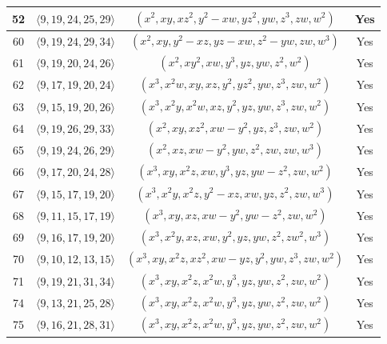 \documentclass{amsart}
\theoremstyle{plain}
\theoremstyle{definition}
\numberwithin{theorem}{section}
\numberwithin{equation}{section}
\numberwithin{equation}{theorem}
\begin{document}
\begin{longtable}{|c|c|c|c|}
\hline
52 & $\langle 9,19,24,25,29\rangle$ & $(x^2, xy, xz^2, y^2-xw, yz^2, yw, z^3, zw, w^2)$ & Yes\\

\hline
60 & $\langle 9,19,24,29,34\rangle$ & $(x^2, xy, y^2-xz, yz-xw, z^2-yw, zw, w^3)$ & Yes\\

\hline
61 & $\langle 9,19,20,24,26\rangle$ & $(x^2, xy^2, xw, y^3, yz, yw, z^2, w^2)$ & Yes\\

\hline
62 & $\langle 9,17,19,20,24\rangle$ & $(x^3, x^2w, xy, xz, y^2, yz^2, yw, z^3, zw, w^2)$ & Yes\\

\hline
63 & $\langle 9,15,19,20,26\rangle$ & $(x^3, x^2y, x^2w, xz, y^2, yz, yw, z^3, zw, w^2)$ & Yes\\

\hline
64 & $\langle 9,19,26,29,33\rangle$ & $(x^2, xy, xz^2, xw-y^2, yz, z^3, zw, w^2)$ & Yes\\

\hline
65 & $\langle 9,19,24,26,29\rangle$ & $(x^2, xz, xw-y^2, yw, z^2, zw, zw, w^3)$ & Yes\\

\hline
66 & $\langle 9,17,20,24,28\rangle$ & $(x^3, xy, x^2z, xw, y^3, yz, yw-z^2, zw, w^2)$ & Yes\\

\hline
67 & $\langle 9,15, 17, 19, 20\rangle$ & $(x^3, x^2y, x^2z, y^2-xz, xw, yz, z^2, zw, w^3)$ & Yes\\
\hline
68 & $\langle 9,11,15,17,19\rangle$ & $(x^3,xy,xz,xw-y^2,yw-z^2,zw,w^2)$ & Yes\\

\hline
69 & $\langle 9,16,17,19,20\rangle$ & $(x^3,x^2y,xz,xw,y^2,yz,yw,z^2,zw^2,w^3)$ & Yes\\

\hline
70 & $\langle 9,10,12,13,15\rangle$ & $(x^3,xy,x^2z,xz^2,xw-yz,y^2,yw,z^3,zw,w^2)$ & Yes\\

\hline
71 & $\langle 9,19,21,31,34\rangle$ & $(x^3,xy,x^2z,x^2w,y^3,yz,yw,z^2,zw,w^2)$ & Yes\\

\hline
74 & $\langle 9,13,21,25,28\rangle$ & $(x^3,xy,x^2z,x^2w,y^3,yz,yw,z^2,zw,w^2)$ & Yes\\

\hline
75 & $\langle 9,16,21,28,31\rangle$ & $(x^3,xy,x^2z,x^2w,y^3,yz,yw,z^2,zw,w^2)$ & Yes\\


\end{longtable}
\end{document}
